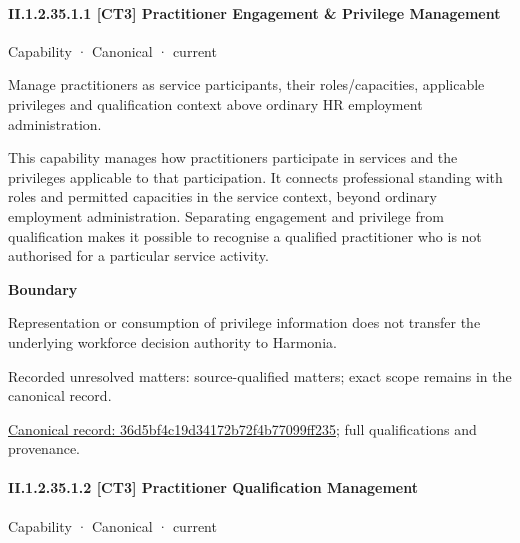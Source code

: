 \paragraph*{II.1.2.35.1.1 [CT3] Practitioner Engagement \& Privilege Management}
\label{navigation:II.1.2.35.1.1}

\label{element:36d5bf4c19d34172b72f4b77099ff235}
{\small Capability · Canonical · current}\par

Manage practitioners as service participants, their roles/capacities, applicable privileges and qualification context above ordinary HR employment administration.



This capability manages how practitioners participate in services and the privileges applicable to that participation. It connects professional standing with roles and permitted capacities in the service context, beyond ordinary employment administration. Separating engagement and privilege from qualification makes it possible to recognise a qualified practitioner who is not authorised for a particular service activity.



\textbf{Boundary}



Representation or consumption of privilege information does not transfer the underlying workforce decision authority to Harmonia.


{\small Recorded unresolved matters: source-qualified matters; exact scope remains in the canonical record.}\par
{\footnotesize \href{../../../../continuum/strategy/capability/36d5bf4c19d34172b72f4b77099ff235.md}{Canonical record: 36d5bf4c19d34172b72f4b77099ff235}; full qualifications and provenance.}\par
\paragraph*{II.1.2.35.1.2 [CT3] Practitioner Qualification Management}
\label{navigation:II.1.2.35.1.2}

\label{element:279bab5de1b74c17a5ee2db5cae8d385}
{\small Capability · Canonical · current}\par

